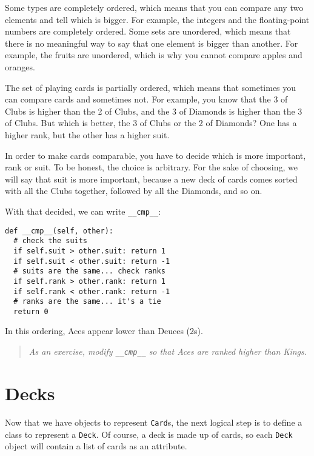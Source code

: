 Some types are completely ordered, which means that you can compare
any two elements and tell which is bigger.  For example, the integers
and the floating-point numbers are completely ordered.  Some sets are
unordered, which means that there is no meaningful way to say that one
element is bigger than another.  For example, the fruits are
unordered, which is why you cannot compare apples and oranges.

The set of playing cards is partially ordered, which means that
sometimes you can compare cards and sometimes not.  For example, you
know that the 3 of Clubs is higher than the 2 of Clubs, and the 3 of
Diamonds is higher than the 3 of Clubs.  But which is better, the 3 of
Clubs or the 2 of Diamonds?  One has a higher rank, but the other has
a higher suit.


In order to make cards comparable, you have to decide which is more
important, rank or suit.  To be honest, the choice is
arbitrary.  For the sake of choosing, we will say that suit is more
important, because a new deck of cards comes sorted
with all the Clubs together, followed by all the Diamonds, and so on.

With that decided, we can write {\tt \_\_cmp\_\_}:

\beforeverb
\begin{verbatim}
def __cmp__(self, other):
  # check the suits
  if self.suit > other.suit: return 1
  if self.suit < other.suit: return -1
  # suits are the same... check ranks
  if self.rank > other.rank: return 1
  if self.rank < other.rank: return -1
  # ranks are the same... it's a tie
  return 0
\end{verbatim}
\afterverb
%
In this ordering, Aces appear lower than Deuces (2s).

\begin{quote}
{\em As an exercise, modify {\tt \_\_cmp\_\_} so that Aces are
ranked higher than Kings.}
\end{quote}


\section{Decks}

Now that we have objects to represent {\tt Card}s, the next logical
step is to define a class to represent a {\tt Deck}.  Of course, a
deck is made up of cards, so each {\tt Deck} object will contain a
list of cards as an attribute.

